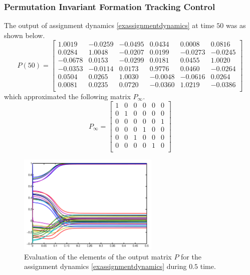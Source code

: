 \documentclass[11pt, a4paper, oneside, openany, reqno]{book}
\theoremstyle{definition}
\theoremstyle{remark}
\numberwithin{equation}{chapter} %
\begin{document}
\subsubsection{Permutation Invariant Formation Tracking Control}
The output of assignment dynamics \eqref{exassignmentdynamics} at time $ 50 $ was as shown below.
\begin{equation}
	P(50)=\left[\begin{array}{cccccc}
    1.0019&   -0.0259&   -0.0495&    0.0434&    0.0008&    0.0816\\
    0.0284&    1.0048&   -0.0207&    0.0199&   -0.0273&   -0.0245\\
   -0.0678&    0.0153&   -0.0299&    0.0181&    0.0455&    1.0020\\
   -0.0353&   -0.0114&    0.0173&    0.9776&    0.0460&   -0.0264\\
    0.0504&    0.0265&    1.0030&   -0.0048&   -0.0616&    0.0264\\
    0.0081&    0.0235&    0.0720&   -0.0360&    1.0219&   -0.0386\\
	\end{array}\right]
\end{equation}
which approximated the following matrix $ P_\infty $.
\begin{equation}
	P_\infty=\left[\begin{array}{cccccc}
    1&    0&    0&    0&    0&    0\\
    0&    1&    0&    0&    0&    0\\
    0&    0&    0&    0&    0&    1\\
    0&    0&    0&    1&    0&    0\\
    0&    0&    1&    0&    0&    0\\
    0&    0&    0&    0&    1&    0\\
	\end{array}\right]
\end{equation}


\begin{figure}[htp]
	\centering
	\includegraphics[width=0.60\textwidth]{pdynamics.pdf}
	\caption{Evaluation of the elements of the output matrix $ P $ 
		for the assignment dynamics \eqref{exassignmentdynamics} during $ 0.5 $ time.}	
\end{figure}
\end{document}
